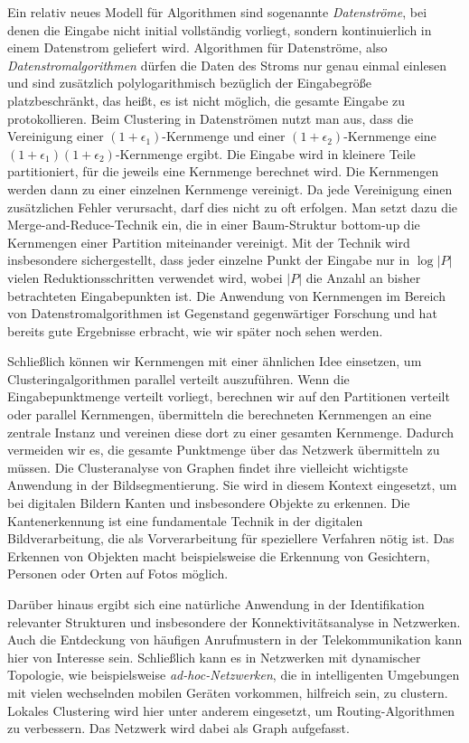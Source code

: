 Ein relativ neues Modell für Algorithmen sind sogenannte \emph{Datenströme}, bei denen die Eingabe nicht initial vollständig
vorliegt, sondern kontinuierlich in einem Datenstrom geliefert wird. Algorithmen für Datenströme, also
\emph{Datenstromalgorithmen} dürfen die Daten des Stroms nur genau einmal einlesen und sind zusätzlich polylogarithmisch
bezüglich der Eingabegröße platzbeschränkt, das heißt, es ist nicht möglich, die gesamte Eingabe zu protokollieren.
Beim Clustering in Datenströmen nutzt man aus, dass die Vereinigung einer $(1 + \epsilon_1)$-Kernmenge und einer
$(1 + \epsilon_2)$-Kernmenge eine $(1 + \epsilon_1) (1 + \epsilon_2)$-Kernmenge ergibt. Die Eingabe wird in kleinere Teile
partitioniert, für die jeweils eine Kernmenge berechnet wird. Die Kernmengen werden dann zu einer einzelnen Kernmenge
vereinigt. Da jede Vereinigung einen zusätzlichen Fehler verursacht, darf dies nicht zu oft erfolgen. Man setzt dazu die
Merge-and-Reduce-Technik ein, die in einer Baum-Struktur bottom-up die Kernmengen einer Partition miteinander vereinigt.
Mit der Technik wird insbesondere sichergestellt, dass jeder einzelne Punkt der Eingabe nur in $\log \left|P\right|$ vielen
Reduktionsschritten verwendet wird, wobei $\left|P\right|$ die Anzahl an bisher betrachteten Eingabepunkten ist.
Die Anwendung von Kernmengen im Bereich von Datenstromalgorithmen ist Gegenstand gegenwärtiger Forschung und hat bereits
gute Ergebnisse erbracht, wie wir später noch sehen werden.

Schließlich können wir Kernmengen mit einer ähnlichen Idee einsetzen, um Clusteringalgorithmen parallel verteilt auszuführen.
Wenn die Eingabepunktmenge verteilt vorliegt, berechnen wir auf den Partitionen verteilt oder parallel Kernmengen, übermitteln die
berechneten Kernmengen an eine zentrale Instanz und vereinen diese dort zu einer gesamten Kernmenge. Dadurch vermeiden wir es,
die gesamte Punktmenge über das Netzwerk übermitteln zu müssen.
\absatz
Die Clusteranalyse von Graphen findet ihre vielleicht wichtigste Anwendung in der Bildsegmentierung. Sie wird in diesem
Kontext eingesetzt, um bei digitalen Bildern Kanten und insbesondere Objekte zu erkennen. Die Kantenerkennung ist eine
fundamentale Technik in der digitalen Bildverarbeitung, die als Vorverarbeitung für speziellere Verfahren nötig ist. Das Erkennen
von Objekten macht beispielsweise die Erkennung von Gesichtern, Personen oder Orten auf Fotos möglich.

Darüber hinaus ergibt sich eine natürliche Anwendung in der Identifikation relevanter Strukturen und insbesondere der
Konnektivitätsanalyse in Netzwerken. Auch die Entdeckung von häufigen Anrufmustern in der Telekommunikation kann hier
von Interesse sein. Schließlich kann es in Netzwerken mit dynamischer Topologie, wie beispielsweise \emph{ad-hoc-Netzwerken},
die in intelligenten Umgebungen mit vielen wechselnden mobilen Geräten vorkommen, hilfreich sein, zu clustern. Lokales Clustering
wird hier unter anderem eingesetzt, um Routing-Algorithmen zu verbessern. Das Netzwerk wird dabei als Graph aufgefasst.

